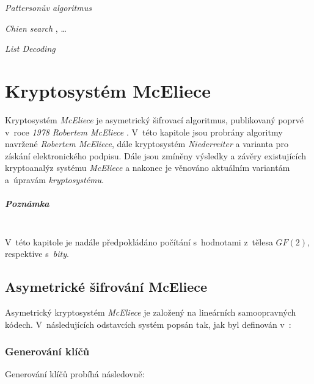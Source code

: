 \documentclass[thesis=M,czech,hidelinks]{FITthesis}[2012/06/26]
\newcommand{\0}{{\textcolor[gray]{0.80}{0}}}
\begin{document}
\emph{Pattersonův algoritmus}

\emph{Chien search} , \ldots

\emph{List Decoding}  \cite{Repka}




\chapter{Kryptosystém McEliece}\label{kap_mceliece}
Kryptosystém \emph{McEliece} je asymetrický šifrovací algoritmus, publikovaný
poprvé v~roce \emph{1978} \emph{Robertem McEliece} \cite{McEliece}.
V~této kapitole jsou probrány algoritmy navržené \emph{Robertem
McEliece}, dále kryptosystém \emph{Niederreiter} a varianta pro získání
elektronického podpisu. Dále jsou zmíněny výsledky a závěry existujících
kryptoanalýz systému \emph{McEliece} a nakonec je věnováno aktuálním variantám
a~úpravám \emph{kryptosystému}.

\paragraph{Poznámka} \hfil \\
V~této kapitole je nadále předpokládáno počítání s~hodnotami z~tělesa $GF(2)$,
respektive s~\emph{bity}.

\section{Asymetrické šifrování McEliece}
Asymetrický kryptosystém \emph{McEliece} je založený na lineárních samoopravných
kódech. V~následujících odstavcích systém popsán tak, jak byl
definován v~\cite{McEliece}:

\subsection{Generování klíčů}
Generování klíčů probíhá následovně:
\end{document}
